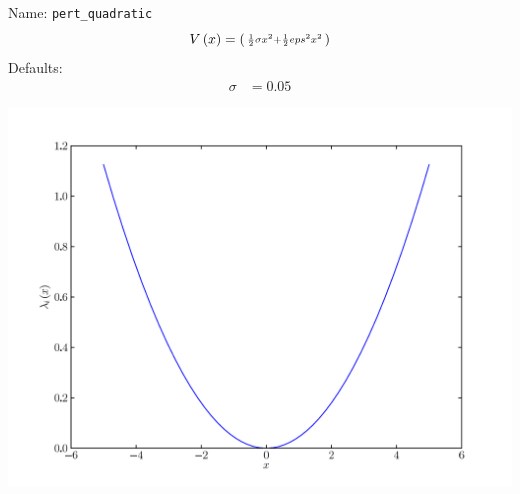 \documentclass[a4paper,10pt]{report}
\begin{document}
\begin{minipage}{0.5\linewidth}
  Name:    \texttt{pert\_quadratic}
  \begin{equation*}
    V\left( x \right) = \left(\begin{smallmatrix}\frac{1}{2} \sigma x^{2} + \frac{1}{2} eps^{2} x^{2}\end{smallmatrix}\right)
  \end{equation*}
  Defaults:
  \begin{align*}
    \sigma & = 0.05
  \end{align*}
\end{minipage}
\begin{minipage}{0.5\linewidth}
  \begin{center}
    \includegraphics[scale=0.25]{./fig/pert_quadratic.pdf}
  \end{center}
\end{minipage}
\end{document}

